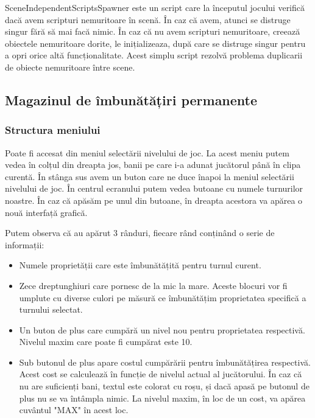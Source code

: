 \documentclass[12pt, a4paper]{article}
\begin{document}
	SceneIndependentScriptsSpawner este un script care la începutul jocului verifică dacă avem scripturi nemuritoare în scenă. În caz că avem, atunci se distruge singur fără să mai facă nimic. În caz că nu avem scripturi nemuritoare, creează obiectele nemuritoare dorite, le inițializeaza, după care se distruge singur pentru a opri orice altă funcționalitate. Acest simplu script rezolvă problema duplicarii de obiecte nemuritoare între scene.
	
	
	
	
	
	\subsection{Magazinul de îmbunătățiri permanente}
	\label{section: permanentUpgrade}
	
	\subsubsection{Structura meniului}
	
	Poate fi accesat din meniul selectării nivelului de joc. La acest meniu putem vedea în colțul din dreapta jos, banii pe care i-a adunat jucătorul până în clipa curentă. În stânga sus avem un buton care ne duce înapoi la meniul selectării nivelului de joc. În centrul ecranului putem vedea butoane cu numele turnurilor noastre. În caz că apăsăm pe unul din butoane, în dreapta acestora va apărea o nouă interfață grafică.
	\newline
	
	Putem observa că au apărut 3 rânduri, fiecare rând conținând o serie de informații:
	
	\begin{itemize}
		\item Numele proprietății care este îmbunătățită pentru turnul curent.
		\item Zece dreptunghiuri care pornesc de la mic la mare. Aceste blocuri vor fi umplute cu diverse culori pe măsură ce îmbunătățim proprietatea specifică a turnului selectat.
		\item Un buton de plus care cumpără un nivel nou pentru proprietatea respectivă. Nivelul maxim care poate fi cumpărat este 10.
		\item Sub butonul de plus apare costul cumpărării pentru îmbunătățirea respectivă. Acest cost se calculează în funcție de nivelul actual al jucătorului. În caz că nu are suficienți bani, textul este colorat cu roșu, și dacă apasă pe butonul de plus nu se va întâmpla nimic. La nivelul maxim, în loc de un cost, va apărea cuvântul "MAX" în acest loc.
	\end{itemize}
	
\end{document}
